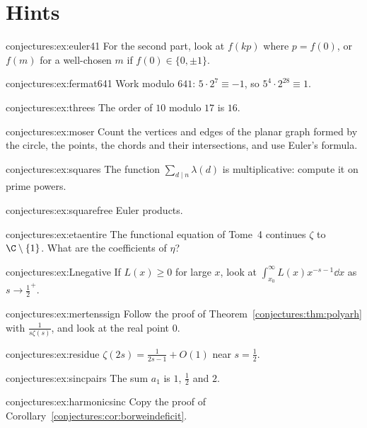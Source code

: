 \section{Hints}

\begin{hint}{conjectures:ex:euler41}
For the second part, look at $f(kp)$ where $p=f(0)$, or $f(m)$ for a well-chosen $m$ if $f(0)\in\{0,\pm1\}$.
\end{hint}
\begin{hint}{conjectures:ex:fermat641}
Work modulo $641$: $5\cdot2^7\equiv-1$, so $5^4\cdot2^{28}\equiv1$.
\end{hint}
\begin{hint}{conjectures:ex:threes}
The order of $10$ modulo $17$ is $16$.
\end{hint}
\begin{hint}{conjectures:ex:moser}
Count the vertices and edges of the planar graph formed by the circle, the points, the chords and their intersections, and use Euler's formula.
\end{hint}
\begin{hint}{conjectures:ex:squares}
The function $\sum_{d\mid n}\lambda(d)$ is multiplicative: compute it on prime powers.
\end{hint}
\begin{hint}{conjectures:ex:squarefree}
Euler products.
\end{hint}
\begin{hint}{conjectures:ex:etaentire}
The functional equation of Tome~4 continues $\zeta$ to $\C\setminus\{1\}$. What are the coefficients of $\eta$?
\end{hint}
\begin{hint}{conjectures:ex:Lnegative}
If $L(x)\ge0$ for large $x$, look at $\int_{x_0}^\infty L(x)x^{-s-1}\dd x$ as $s\to\frac12^+$.
\end{hint}
\begin{hint}{conjectures:ex:mertenssign}
Follow the proof of Theorem~\ref{conjectures:thm:polyarh} with $\frac1{s\zeta(s)}$, and look at the real point $0$.
\end{hint}
\begin{hint}{conjectures:ex:residue}
$\zeta(2s)=\frac1{2s-1}+O(1)$ near $s=\frac12$.
\end{hint}
\begin{hint}{conjectures:ex:sincpairs}
The sum $a_1$ is $1$, $\frac12$ and $2$.
\end{hint}
\begin{hint}{conjectures:ex:harmonicsinc}
Copy the proof of Corollary~\ref{conjectures:cor:borweindeficit}.
\end{hint}

